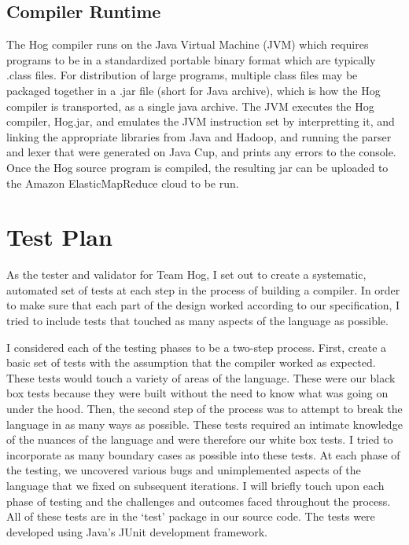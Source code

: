 \documentclass{report}
\begin{document}
\section{Compiler Runtime}

	The Hog compiler runs on the Java Virtual Machine (JVM) which requires programs to be in a standardized portable binary format which are typically .class files. For distribution of large programs,
multiple class files may be packaged together in a .jar file (short for Java archive), which is how the Hog
compiler is transported, as a single java archive.  The JVM executes the Hog compiler, Hog.jar, and emulates
the JVM instruction set by interpretting it, and linking the appropriate libraries from Java and Hadoop, and running the parser and lexer that were generated on Java Cup, and prints any errors to the console. Once the 
Hog source program is compiled, the resulting jar can be uploaded to the Amazon ElasticMapReduce cloud to be run. 


\chapter{Test Plan}
\label{chap:test}

As the tester and validator for Team Hog, I set out to create a systematic, automated set of tests at each step in the process of building a compiler. In order to make sure that each part of the design worked according to our specification, I tried to include tests that touched as many aspects of the language as possible. 

I considered each of the testing phases to be a two-step process. First, create a basic set of tests with the assumption that the compiler worked as expected. These tests would touch a variety of areas of the language. These were our black box tests because they were built without the need to know what was going on under the hood. Then, the second step of the process was to attempt to break the language in as many ways as possible. These tests required an intimate knowledge of the nuances of the language and were therefore our white box tests. I tried to incorporate as many boundary cases as possible into these tests. At each phase of the testing, we uncovered various bugs and unimplemented aspects of the language that we fixed on subsequent iterations. I will briefly touch upon each phase of testing and the challenges and outcomes faced throughout the process. All of these tests are in the ‘test’ package in our source code. The tests were developed using Java’s JUnit development framework.
\end{document}
